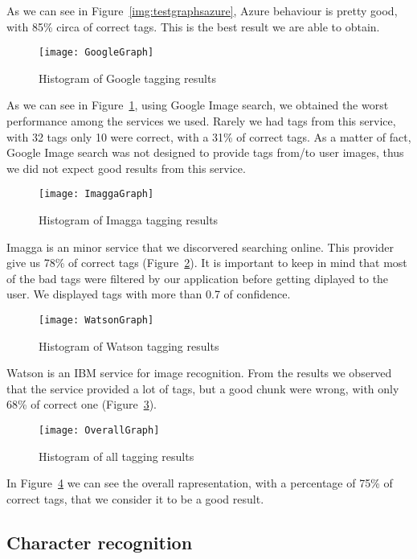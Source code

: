 As we can see in Figure~\ref{img:testgraphsazure}, Azure behaviour is pretty good, with 85\% circa of correct tags. This is the best result we are able to obtain.

\begin{figure}[H]
\centering
\texttt{[image: GoogleGraph]}
\caption{Histogram of Google tagging results}
\label{img:testgraphgoogle}
\end{figure}

As we can see in Figure~\ref{img:testgraphgoogle}, using Google Image search, we obtained the worst performance among the services we used. Rarely we had tags from this service, with 32 tags only 10 were correct, with a 31\% of correct tags. As a matter of fact, Google Image search was not designed to provide tags from/to user images, thus we did not expect good results from this service.

\begin{figure}[H]
\centering
\texttt{[image: ImaggaGraph]}
\caption{Histogram of Imagga tagging results}
\label{img:testgraphimagga}
\end{figure}

Imagga is an minor service that we discorvered searching online. This provider give us 78\% of correct tags (Figure~\ref{img:testgraphimagga}). It is important to keep in mind that most of the bad tags were filtered by our application before getting diplayed to the user. We displayed tags with more than 0.7 of confidence.

\begin{figure}[H]
\centering
\texttt{[image: WatsonGraph]}
\caption{Histogram of Watson tagging results}
\label{img:testgraphwatson}
\end{figure}

Watson is an IBM service for image recognition. From the results we observed that the service provided a lot of tags, but a good chunk were wrong, with only 68\% of correct one (Figure~\ref{img:testgraphwatson}).

\begin{figure}[H]
\centering
\texttt{[image: OverallGraph]}
\caption{Histogram of all tagging results}
\label{img:testgraphoverall}
\end{figure}

In Figure~\ref{img:testgraphoverall} we can see the overall rapresentation, with a percentage of 75\% of correct tags, that we consider it to be a good result.

\subsection{Character recognition}

